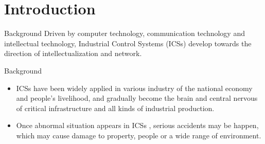\section{Introduction}
\begin{frame}{Background}
    Driven by computer technology, communication technology and intellectual technology, Industrial Control Systems (ICSs) develop towards the direction of intellectualization and network.
    \begin{center}
        
    \end{center}
\end{frame}

\begin{frame}{Background}
    \begin{itemize}
      \item ICSs have been widely applied in various industry of the national economy and people's livelihood, and gradually become the brain and central nervous of critical infrastructure and all kinds of industrial production.
      \item Once abnormal situation appears in ICSs , serious accidents may be happen, which may cause damage to property, people or a wide range of environment.
    \end{itemize}


\end{frame}
